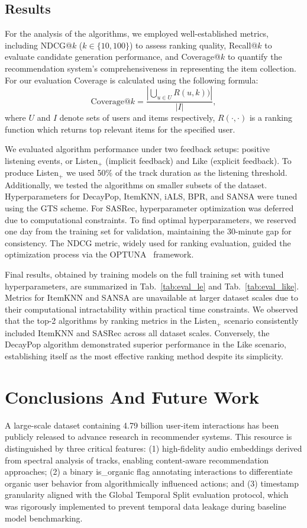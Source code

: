 \documentclass[sigconf,authorversion,nonacm]{acmart}
\begin{document}
\subsection{Results}
For the analysis of the algorithms, we employed well-established metrics, including NDCG@$k$ ($k\in\{10,100\}$) to assess ranking quality, Recall@$k$ to evaluate candidate generation performance, and Coverage@$k$ to quantify the recommendation system’s comprehensiveness in representing the item collection. For our evaluation Coverage is calculated using the following formula:
$$\text{Coverage@}k = \frac{|\bigcup_{u \in U}{R(u, k))}|}{|I|},$$
where $U$ and $I$ denote sets of users and items respectively, $R(\cdot, \cdot)$ is a ranking function which returns top relevant items for the specified user.

We evaluated algorithm performance under two feedback setups: positive listening events, or Listen$_+$ (implicit feedback) and Like (explicit feedback). To produce Listen$_+$ we used 50\% of the track duration as the listening threshold.
Additionally, we tested the algorithms on smaller subsets of the dataset. Hyperparameters for DecayPop, ItemKNN, iALS, BPR, and SANSA were tuned using the GTS scheme. For SASRec, hyperparameter optimization was deferred due to computational constraints. To find optimal hyperparameters, we reserved one day from the training set for validation, maintaining the 30-minute gap for consistency. The NDCG metric, widely used for ranking evaluation, guided the optimization process via the OPTUNA~\cite{akiba2019optuna} framework.

Final results, obtained by training models on the full training set with tuned hyperparameters, are summarized in Tab.~\ref{tab:eval_le} and Tab.~\ref{tab:eval_like}. Metrics for ItemKNN and SANSA are unavailable at larger dataset scales due to their computational intractability within practical time constraints. We observed that the top-2 algorithms by ranking metrics in the Listen$_+$ scenario consistently included ItemKNN and SASRec across all dataset scales. Conversely, the DecayPop algorithm demonstrated superior performance in the Like scenario, establishing itself as the most effective ranking method despite its simplicity.

\section{Conclusions And Future Work}\label{sec:future}

A large-scale dataset containing 4.79 billion user-item interactions has been publicly released to advance research in recommender systems. This resource is distinguished by three critical features: (1) high-fidelity audio embeddings derived from spectral analysis of tracks, enabling content-aware recommendation approaches; (2) a binary is\_organic flag annotating interactions to differentiate organic user behavior from algorithmically influenced actions; and (3) timestamp granularity aligned with the Global Temporal Split evaluation protocol, which was rigorously implemented to prevent temporal data leakage during baseline model benchmarking.
\end{document}
